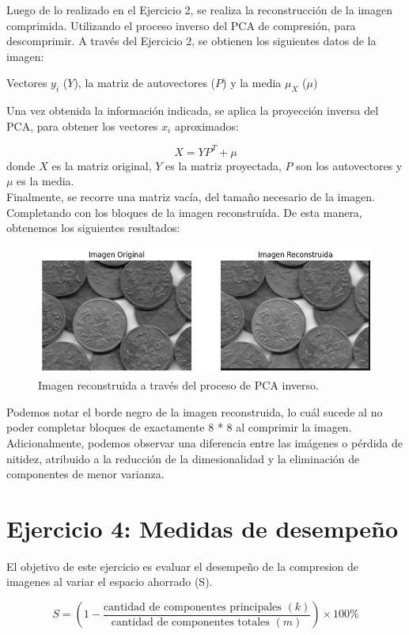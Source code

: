 \documentclass[a4paper,12pt]{article}
\numberwithin{equation}{section}
\numberwithin{figure}{section}
\begin{document}
Luego de lo realizado en el Ejercicio 2, se realiza la reconstrucción de la imagen comprimida. Utilizando el proceso inverso del PCA de compresión, para descomprimir.
A través del Ejercicio 2, se obtienen los siguientes datos de la imagen:

Vectores \(y_i\) (\(Y\)), la matriz de autovectores (\(P\)) y la media \(\mu_X\) (\(\mu\))

Una vez obtenida la información indicada, se aplica la proyección inversa del PCA, para obtener los vectores \(x_i\) aproximados:

\[
X = Y P^T + \mu
\]
donde \(X\) es la matriz original, \(Y\) es la matriz proyectada, \(P\) son los autovectores y \(\mu\) es la media.
\\
Finalmente, se recorre una matriz vacía, del tamaño necesario de la imagen. Completando con los bloques de la imagen reconstruída.
De esta manera, obtenemos los siguientes resultados:

\begin{figure}[H]
    \centering
    \includegraphics[width=1\textwidth]{Ejercicio3.png}
    \caption{Imagen reconstruida a través del proceso de PCA inverso.}
    \label{fig:ej3}
\end{figure}

Podemos notar el borde negro de la imagen reconstruida, lo cuál sucede al no poder completar bloques de exactamente 8 * 8 al comprimir la imagen.
Adicionalmente, podemos observar una diferencia entre las imágenes o pérdida de nitidez, atribuido a la reducción de la dimesionalidad y la eliminación de componentes de menor varianza.

\section{Ejercicio 4: Medidas de desempeño}
El objetivo de este ejercicio es evaluar el desempeño de la compresion de imagenes al variar el espacio ahorrado (S). 

\begin{equation}
S = \left( 1 - \frac{\text{cantidad de componentes principales } (k)}{\text{cantidad de componentes totales } (m)} \right) \times 100 \%
\end{equation}
\end{document}
